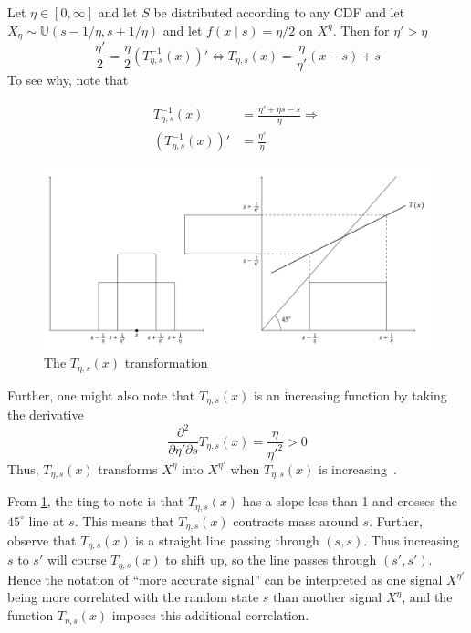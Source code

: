 \documentclass[10pt,a4paper]{article}
\begin{document}
\begin{example}\label{ex:t-transformation-1}
Let  \(\eta\in[0,\infty]\) and let \(S\) be distributed according to any CDF and let \(X_{\eta}\sim\mathbb{U}(s-1/\eta,s+1/\eta)\) and let \(f(x\mid s)=\eta\big /2\) on \(X^\eta\). Then for \(\eta'>\eta\)
\[
	\frac{\eta'}{2}=\frac{\eta}{2}\left(T_{\eta,s}^{-1}(x)\right)'\Leftrightarrow T_{\eta,s}(x)=\frac{\eta}{\eta'}(x-s)+s
\]
To see why, note that

\begin{align*}
	T^{-1}_{\eta,s}(x)               &=\frac{\eta'+\eta s-s}{\eta} \Rightarrow \\
	\left(T^{-1}_{\eta,s}(x)\right)' &=\frac{\eta'}{\eta}
\end{align*}

\begin{figure}
	\includegraphics[width=\textwidth]{t-transformation.pdf}
	\caption{\label{fig:t-transformation}The \(T_{\eta,s}(x)\) transformation}
\end{figure}

Further, one might also note that \(T_{\eta,s}(x)\) is an increasing function by taking the derivative
\[
	\frac{\partial^2}{\partial \eta'\partial s}T_{\eta,s}(x)=\frac{\eta}{\eta'^2}>0
\]
Thus, \(T_{\eta,s}(x)\) transforms \(X^{\eta}\) into \(X^{\eta'}\) when \(T_{\eta,s}(x)\) is increasing~\citep{Persico1996}.

From \cref{fig:t-transformation}, the ting to note is that \(T_{\eta,s}(x)\) has a slope less than 1 and crosses the \(45^\circ\) line at \(s\). This means that \(T_{\eta,s}(x)\) contracts mass around \(s\). Further, observe that \(T_{\eta,s}(x)\) is a straight line passing through \((s,s)\). Thus increasing \(s\) to \(s'\) will course \(T_{\eta,s}(x)\) to shift up, so the line passes through \((s',s')\). Hence the notation of ``more accurate signal'' can be interpreted as one signal \(X^{\eta'}\) being more correlated with the random state \(s\) than another signal \(X^\eta\), and the function \(T_{\eta,s}(x)\) imposes this additional correlation.
\end{example}
\end{document}
